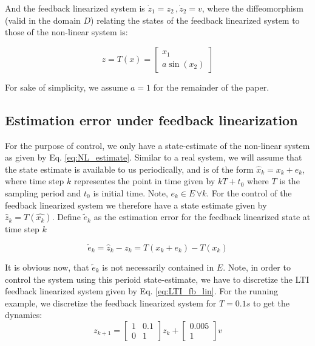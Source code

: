 And the feedback linearized system is $\dot{z}_1 = z_2\, ,\dot{z}_2 = v$, where the diffeomorphism (valid in the domain $D$) relating the states of the feedback linearized system to those of the non-linear system is:

\begin{equation}
z = T(x) = \begin{bmatrix} x_1 \\ a\sin(x_2) \end{bmatrix}
\end{equation}

For sake of simplicity, we assume $a=1$ for the remainder of the paper.

\subsection{Estimation error under feedback linearization}
\label{sec:EstErrFbLin}
For the purpose of control, we only have a state-estimate of the non-linear system as given by Eq. \ref{eq:NL_estimate}. Similar to a real system, we will assume that the state estimate is available to us periodically, and is of the form $\hat{x}_k = x_k + e_k$, where time step $k$ representes the point in time given by $kT+t_0$ where $T$ is the sampling period and $t_0$ is initial time. Note, $e_k \in E \, \forall k$. For the control of the feedback linearized system we therefore have a state estimate given by $\hat{z}_k = T(\hat{x_k})$. Define $\tilde{e}_k$ as the estimation error for the feedback linearized state at time step $k$

\begin{equation}
\label{eq:NLesterr}
\tilde{e}_k =\hat{z}_k - z_k =  T(x_k + e_k) - T(x_k)
\end{equation}

It is obvious now, that $\tilde{e}_k$ is not necessarily contained in  $E$. Note, in order to control the system using this perioid state-estimate, we have to discretize the LTI feedback linearized system given by Eq. \ref{eq:LTI_fb_lin}. For the running example, we discretize the feedback linearized system for $T=0.1s$ to get the dynamics:
\begin{equation}
\label{toy_dt}
z_{k+1} = \begin{bmatrix} 1 & 0.1 \\ 0 & 1 \end{bmatrix} z_k + \begin{bmatrix} 0.005 \\ 1 \end{bmatrix}v
\end{equation}

